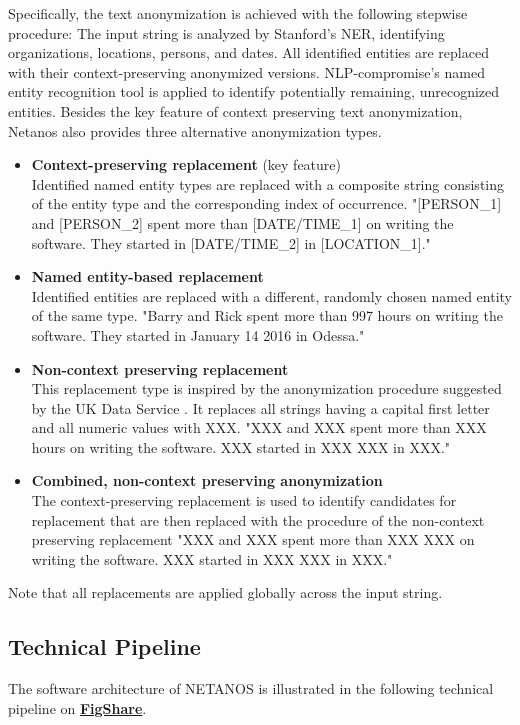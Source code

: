 \documentclass{article}
\begin{document}
\noindent Specifically, the text anonymization is achieved with the following stepwise procedure: The input string is analyzed by Stanford's NER, identifying organizations, locations, persons, and dates. All identified entities are replaced with their context-preserving anonymized versions. NLP-compromise's named entity recognition tool is applied to identify potentially remaining, unrecognized entities.
\vskip 0.5cm
\noindent Besides the key feature of context preserving text anonymization, Netanos also provides three alternative anonymization types. 
\begin{itemize}
\item \textbf{Context-preserving replacement} (key feature) \\
Identified named entity types are replaced with a composite string consisting of the entity type and the corresponding index of occurrence. "[PERSON\_1] and [PERSON\_2] spent more than [DATE/TIME\_1] on writing the software. They started in [DATE/TIME\_2] in [LOCATION\_1]."
\item \textbf{Named entity-based replacement} \\
Identified entities are replaced with a different, randomly chosen named entity of the same type. "Barry and Rick spent more than 997 hours on writing the software. They started in January 14 2016 in Odessa."
\item \textbf{Non-context preserving replacement} \\
This replacement type is inspired by the anonymization procedure suggested by the UK Data Service \cite{ukda}. It replaces all strings having a capital first letter and all numeric values with XXX. "XXX and XXX spent more than XXX hours on writing the software. XXX started in XXX XXX in XXX."
\item \textbf{Combined, non-context preserving anonymization} \\
The context-preserving replacement is used to identify candidates for replacement that are then replaced with the procedure of the non-context preserving replacement "XXX and XXX spent more than XXX XXX on writing the software. XXX started in XXX XXX in XXX." 
\end{itemize}
Note that all replacements are applied globally across the input string.

\subsection*{Technical Pipeline}
The software architecture of NETANOS is illustrated in the following technical pipeline on \href{https://figshare.com/s/fe13585ae5e482601ce5}{\textbf{FigShare}}.
\end{document}

